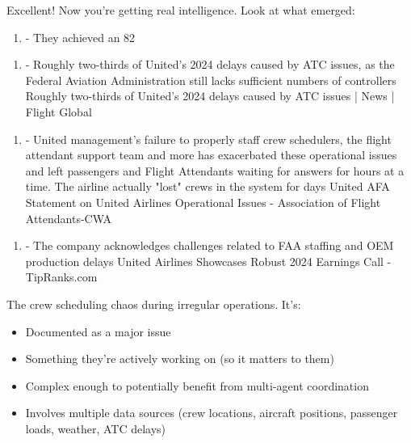 
Excellent! Now you're getting real intelligence. Look at what emerged:


\begin{enumerate}
\item {} - They achieved an 82%
\end{enumerate}
\begin{enumerate}
\item {} - Roughly two-thirds of United's 2024 delays caused by ATC issues, as the Federal Aviation Administration still lacks sufficient numbers of controllers Roughly two-thirds of United’s 2024 delays caused by ATC issues | News | Flight Global
\end{enumerate}
\begin{enumerate}
\item {} - United management's failure to properly staff crew schedulers, the flight attendant support team and more has exacerbated these operational issues and left passengers and Flight Attendants waiting for answers for hours at a time. The airline actually "lost" crews in the system for days United AFA Statement on United Airlines Operational Issues - Association of Flight Attendants-CWA
\end{enumerate}
\begin{enumerate}
\item {} - The company acknowledges challenges related to FAA staffing and OEM production delays United Airlines Showcases Robust 2024 Earnings Call - TipRanks.com
\end{enumerate}

 The crew scheduling chaos during irregular operations. It's:

\begin{itemize}
\item Documented as a major issue
\end{itemize}
\begin{itemize}
\item Something they're actively working on (so it matters to them)
\end{itemize}
\begin{itemize}
\item Complex enough to potentially benefit from multi-agent coordination
\end{itemize}
\begin{itemize}
\item Involves multiple data sources (crew locations, aircraft positions, passenger loads, weather, ATC delays)
\end{itemize}

